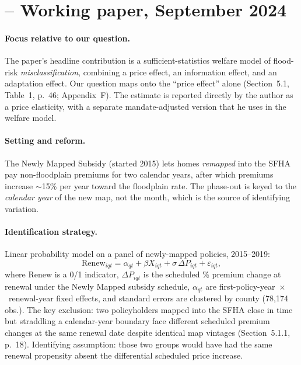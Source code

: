 \documentclass[11pt]{article}
\begin{document}
\section{\citet{mulder2024} -- Working paper, September 2024}

\paragraph{Focus relative to our question.}
The paper's headline contribution is a sufficient-statistics welfare model
of flood-risk \emph{misclassification}, combining a price effect, an
information effect, and an adaptation effect. Our question maps onto the
``price effect'' alone (Section~5.1, Table~1, p.~46; Appendix~F).
The estimate is reported directly by the author as a price elasticity, with
a separate mandate-adjusted version that he uses in the welfare model.

\paragraph{Setting and reform.}
The Newly Mapped Subsidy (started 2015) lets homes \emph{remapped} into the
SFHA pay non-floodplain premiums for two calendar years, after which
premiums increase $\sim$15\% per year toward the floodplain rate. The
phase-out is keyed to the \emph{calendar year} of the new map, not the
month, which is the source of identifying variation.

\paragraph{Identification strategy.}
Linear probability model on a panel of newly-mapped policies, 2015--2019:
\[
\text{Renew}_{iqt} = \alpha_{qt} + \beta X_{iqt} + \sigma\,\Delta P_{iqt} + \varepsilon_{iqt},
\]
where Renew is a 0/1 indicator, $\Delta P_{iqt}$ is the scheduled \%
premium change at renewal under the Newly Mapped subsidy schedule,
$\alpha_{qt}$ are first-policy-year~$\times$~renewal-year fixed effects,
and standard errors are clustered by county (78{,}174 obs.). The key
exclusion: two policyholders mapped into the SFHA close in time but
straddling a calendar-year boundary face different scheduled premium
changes at the same renewal date despite identical map vintages
(Section~5.1.1, p.~18). Identifying assumption: those two groups would
have had the same renewal propensity absent the differential scheduled
price increase.
\end{document}
